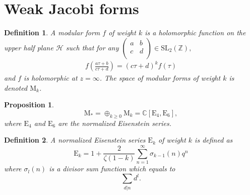 \documentclass[uplatex,dvipdfmx]{jsarticle}
\newtheorem{definition}{Definition}[section]
\newtheorem{proposition}{Proposition}[section]
\begin{document}
\section{Weak Jacobi forms}

\begin{definition}
    A \textit{modular form}
    $f$
    of weight
    $k$
    is a holomorphic function on the upper half plane
    $\mathcal{H}$
    such that for any
    $\begin{pmatrix}
        a &b \\
        c &d \\
    \end{pmatrix}
    \in \mathrm{SL}_2 \left( \mathbb{Z} \right),$
    \begin{align}
        f
        \left( 
        \frac{a \tau + b}{c \tau + d}
        \right)
        =
        (c \tau + d)^k
        f \left( \tau \right)
    \end{align}
    and
    $f$
    is holomorphic at
    $z = \infty$.
    The space of modular forms of weight
    $k$
    is denoted
    $\mathrm{M}_k$.
\end{definition}

\begin{proposition}
    \begin{equation}
        \mathrm{M}_* 
        = 
        \oplus_{k \geq 0} \mathrm{M}_k
        =
        \mathbb{C}[\mathrm{E}_4, \mathrm{E}_6],
    \end{equation}
    where
    $\mathrm{E}_4$
    and
    $\mathrm{E}_6$
    are the normalized Eisenstein series.
\end{proposition}

\begin{definition}
    A normalized Eisenstein series
    $\mathrm{E}_k$
    of weight
    $k$
    is defined as
    \begin{equation}
        \mathrm{E}_k
        =
        1 + \frac{2}{\zeta(1 - k)}
        \sum_{n = 1}^\infty
        \sigma_{k - 1}(n) q^n
    \end{equation}
    where
    $\sigma_l(n)$
    is a divisor sum function
    which equals to
    \begin{equation}
        \sum_{d | n} d^l.
    \end{equation}
\end{definition}
\end{document}
